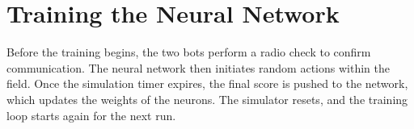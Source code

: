 \section*{Training the Neural Network}
Before the training begins, the two bots perform a radio check to confirm communication. The neural network then initiates random actions within the field. Once the simulation timer expires, the final score is pushed to the network, which updates the weights of the neurons. The simulator resets, and the training loop starts again for the next run.
